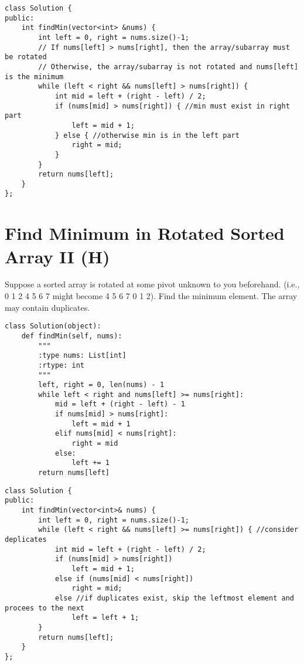 \begin{lstlisting}
class Solution {
public:
    int findMin(vector<int> &nums) {
        int left = 0, right = nums.size()-1;
        // If nums[left] > nums[right], then the array/subarray must be rotated 
        // Otherwise, the array/subarray is not rotated and nums[left] is the minimum
        while (left < right && nums[left] > nums[right]) {
            int mid = left + (right - left) / 2;
            if (nums[mid] > nums[right]) { //min must exist in right part
                left = mid + 1;
            } else { //otherwise min is in the left part
                right = mid;
            }
        }
        return nums[left];
    }
};
\end{lstlisting}


\section{Find Minimum in Rotated Sorted Array II (H)}
Suppose a sorted array is rotated at some pivot unknown to you beforehand.
(i.e., 0 1 2 4 5 6 7 might become 4 5 6 7 0 1 2).
Find the minimum element.
The array may contain duplicates.\\

\begin{lstlisting}
class Solution(object):
    def findMin(self, nums):
        """
        :type nums: List[int]
        :rtype: int
        """
        left, right = 0, len(nums) - 1
        while left < right and nums[left] >= nums[right]:
            mid = left + (right - left) - 1
            if nums[mid] > nums[right]:
                left = mid + 1
            elif nums[mid] < nums[right]:
                right = mid
            else:
                left += 1
        return nums[left]
\end{lstlisting}

\begin{lstlisting}
class Solution {
public:
    int findMin(vector<int>& nums) {
        int left = 0, right = nums.size()-1;
        while (left < right && nums[left] >= nums[right]) { //consider deplicates
            int mid = left + (right - left) / 2;
            if (nums[mid] > nums[right])
                left = mid + 1;
            else if (nums[mid] < nums[right])
                right = mid;
            else //if duplicates exist, skip the leftmost element and procees to the next
                left = left + 1;
        }
        return nums[left];
    }
};
\end{lstlisting}


